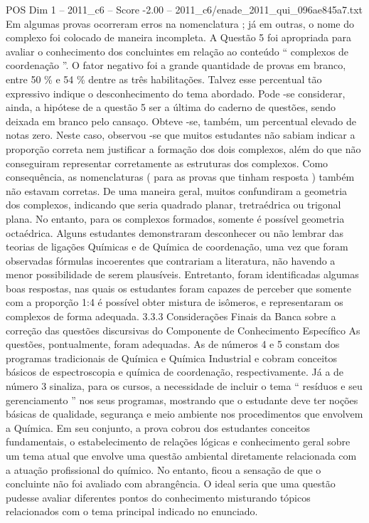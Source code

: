 \begin{textsample}{POS Dim 1 – 2011\_c6 – Score -2.00 – 2011\_c6/enade\_2011\_qui\_096ae845a7.txt}
Em algumas provas ocorreram erros na nomenclatura ; já em outras, o nome do complexo foi colocado de maneira incompleta.
A Questão 5 foi apropriada para avaliar o conhecimento dos concluintes em relação ao conteúdo “ complexos de coordenação ”.
O fator negativo foi a grande quantidade de provas em branco, entre 50 \% e 54 \% dentre as três habilitações.
Talvez esse percentual tão expressivo indique o desconhecimento do tema abordado.
Pode -se considerar, ainda, a hipótese de a questão 5 ser a última do caderno de questões, sendo deixada em branco pelo cansaço.
Obteve -se, também, um percentual elevado de notas zero.
Neste caso, observou -se que muitos estudantes não sabiam indicar a proporção correta nem justificar a formação dos dois complexos, além do que não conseguiram representar corretamente as estruturas dos complexos.
Como consequência, as nomenclaturas ( para as provas que tinham resposta ) também não estavam corretas.
De uma maneira geral, muitos confundiram a geometria dos complexos, indicando que seria quadrado planar, tretraédrica ou trigonal plana.
No entanto, para os complexos formados, somente é possível geometria octaédrica.
Alguns estudantes demonstraram desconhecer ou não lembrar das teorias de ligações Químicas e de Química de coordenação, uma vez que foram observadas fórmulas incoerentes que contrariam a literatura, não havendo a menor possibilidade de serem plausíveis.
Entretanto, foram identificadas algumas boas respostas, nas quais os estudantes foram capazes de perceber que somente com a proporção 1:4 é possível obter mistura de isômeros, e representaram os complexos de forma adequada. 3.3.3 Considerações Finais da Banca sobre a correção das questões discursivas do Componente de Conhecimento Específico As questões, pontualmente, foram adequadas.
As de números 4 e 5 constam dos programas tradicionais de Química e Química Industrial e cobram conceitos básicos de espectroscopia e química de coordenação, respectivamente.
Já a de número 3 sinaliza, para os cursos, a necessidade de incluir o tema “ resíduos e seu gerenciamento ” nos seus programas, mostrando que o estudante deve ter noções básicas de qualidade, segurança e meio ambiente nos procedimentos que envolvem a Química.
Em seu conjunto, a prova cobrou dos estudantes conceitos fundamentais, o estabelecimento de relações lógicas e conhecimento geral sobre um tema atual que envolve uma questão ambiental diretamente relacionada com a atuação profissional do químico.
No entanto, ficou a sensação de que o concluinte não foi avaliado com abrangência.
O ideal seria que uma questão pudesse avaliar diferentes pontos do conhecimento misturando tópicos relacionados com o tema principal indicado no enunciado.

\end{textsample}
